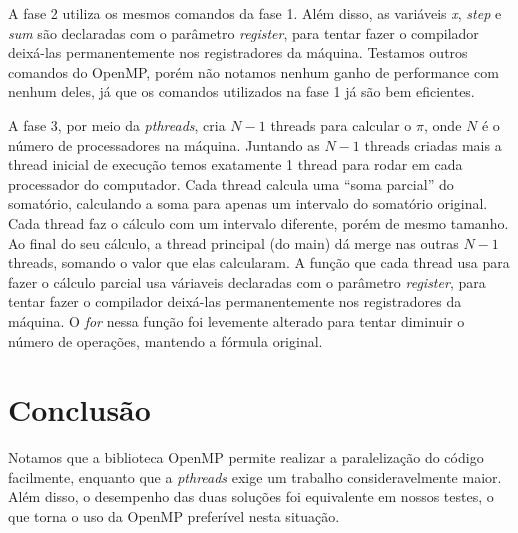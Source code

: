 A fase 2 utiliza os mesmos comandos da fase 1. Além disso, as variáveis \emph{x},
\emph{step} e \emph{sum} são declaradas com o parâmetro \emph{register}, para
tentar fazer o compilador deixá-las permanentemente nos registradores da máquina.
Testamos outros comandos do OpenMP, porém não notamos nenhum ganho de performance
com nenhum deles, já que os comandos utilizados na fase 1 já são bem eficientes.

A fase 3, por meio da \emph{pthreads}, cria $N-1$ threads para calcular o $\pi$,
onde $N$ é o número de processadores na máquina. Juntando as $N-1$ threads criadas
mais a thread inicial de execução temos exatamente 1 thread para rodar em cada
processador do computador. Cada thread calcula uma ``soma parcial'' do somatório,
calculando a soma para apenas um intervalo do somatório original. Cada thread 
faz o cálculo com um intervalo diferente, porém de mesmo tamanho. Ao final do seu
cálculo, a thread principal (do main) dá merge nas outras $N-1$ threads, somando
o valor que elas calcularam. A função que cada thread usa para fazer o cálculo
parcial usa váriaveis declaradas com o parâmetro \emph{register}, para tentar 
fazer o compilador deixá-las permanentemente nos registradores da máquina. O 
\emph{for} nessa função foi levemente alterado para tentar diminuir o número 
de operações, mantendo a fórmula original.

\section{Conclusão}

Notamos que a biblioteca OpenMP permite realizar a paralelização do código 
facilmente, enquanto que a \emph{pthreads} exige um trabalho consideravelmente 
maior. Além disso, o desempenho das duas soluções foi equivalente em nossos 
testes, o que torna o uso da OpenMP preferível nesta situação.

